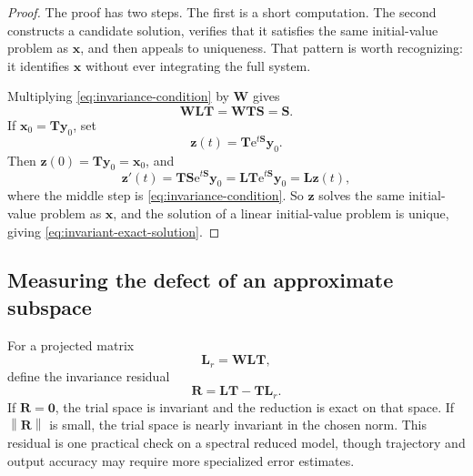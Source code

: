 \documentclass[11pt]{article}
\newcommand{\mat}[1]{\mathbf{#1}}
\newcommand{\vect}[1]{\mathbf{#1}}
\newcommand{\e}{\mathrm{e}}
\newcommand{\norm}[1]{\left\lVert #1\right\rVert}
\theoremstyle{definition}
\theoremstyle{remark}
\begin{document}
\begin{proof}
The proof has two steps. The first is a short computation. The second constructs a
candidate solution, verifies that it satisfies the same initial-value problem as
\(\vect{x}\), and then appeals to uniqueness. That pattern is worth recognizing: it
identifies \(\vect{x}\) without ever integrating the full system.

Multiplying \cref{eq:invariance-condition} by \(\mat{W}\) gives
\[
  \mat{W}\mat{L}\mat{T}
  =\mat{W}\mat{T}\mat{S}
  =\mat{S}.
\]
If \(\vect{x}_0=\mat{T}\vect{y}_0\), set
\[
  \vect{z}(t)=\mat{T}\e^{t\mat{S}}\vect{y}_0.
\]
Then \(\vect{z}(0)=\mat{T}\vect{y}_0=\vect{x}_0\), and
\[
  \vect{z}'(t)
  =\mat{T}\mat{S}\e^{t\mat{S}}\vect{y}_0
  =\mat{L}\mat{T}\e^{t\mat{S}}\vect{y}_0
  =\mat{L}\vect{z}(t),
\]
where the middle step is \cref{eq:invariance-condition}. So \(\vect{z}\) solves the same initial-value problem as \(\vect{x}\), and the solution of a linear initial-value problem is unique, giving \cref{eq:invariant-exact-solution}.
\end{proof}

\subsection{Measuring the defect of an approximate subspace}

For a projected matrix
\[
  \mat{L}_r=\mat{W}\mat{L}\mat{T},
\]
define the invariance residual
\begin{equation}
  \mat{R}=\mat{L}\mat{T}-\mat{T}\mat{L}_r.
  \label{eq:invariance-residual}
\end{equation}
If \(\mat{R}=\mat{0}\), the trial space is invariant and the reduction is exact on that space. If \(\norm{\mat{R}}\) is small, the trial space is nearly invariant in the chosen norm. This residual is one practical check on a spectral reduced model, though trajectory and output accuracy may require more specialized error estimates.
\end{document}
